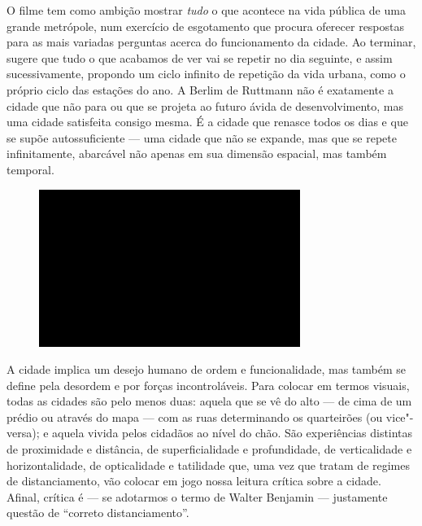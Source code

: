 O filme tem como ambição mostrar \emph{tudo} o que acontece na vida
pública de uma grande metrópole, num exercício de esgotamento que
procura oferecer respostas para as mais variadas perguntas acerca do
funcionamento da cidade. Ao terminar, sugere que tudo o que acabamos de
ver vai se repetir no dia seguinte, e assim sucessivamente, propondo um
ciclo infinito de repetição da vida urbana, como o próprio ciclo das
estações do ano. A Berlim de Ruttmann não é exatamente a cidade que não
para ou que se projeta ao futuro ávida de desenvolvimento, mas uma
cidade satisfeita consigo mesma. É a cidade que renasce todos os dias e
que se supõe autossuficiente --- uma cidade que não se expande, mas que
se repete infinitamente, abarcável não apenas em sua dimensão espacial,
mas também temporal.

\begin{figure}[!ht]
\centering
 \includegraphics[width=85mm]{./imgs/im1.jpg}
\caption{\tiny{}}
\end{figure}

A cidade implica um desejo humano de ordem e funcionalidade, mas também
se define pela desordem e por forças incontroláveis. Para colocar em
termos visuais, todas as cidades são pelo menos duas: aquela que se vê
do alto --- de cima de um prédio ou através do mapa --- com as ruas
determinando os quarteirões (ou vice"-versa); e aquela vivida pelos
cidadãos ao nível do chão. São experiências distintas de proximidade e
distância, de superficialidade e profundidade, de verticalidade e
horizontalidade, de opticalidade e tatilidade que, uma vez que tratam de
regimes de distanciamento, vão colocar em jogo nossa leitura crítica
sobre a cidade. Afinal, crítica é --- se adotarmos o termo de Walter
Benjamin --- justamente questão de ``correto distanciamento''.

